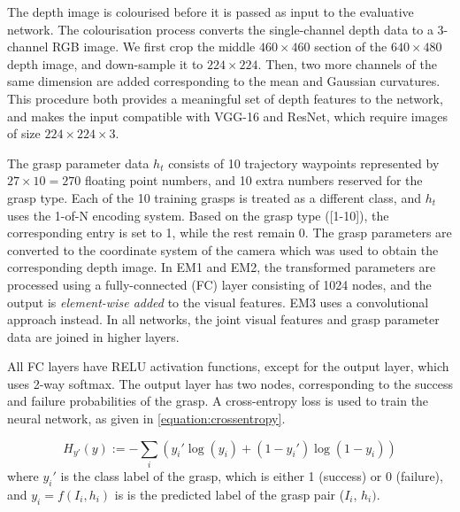 
The depth image is colourised before it is passed as input to the evaluative network. The colourisation process converts the single-channel depth data to a 3-channel RGB image. We first crop the middle $460 \times 460$ section of the $640 \times 480$ depth image, and down-sample it to $224 \times 224$. Then, two more channels of the same dimension are added corresponding to the mean and Gaussian curvatures. %
This procedure both provides a meaningful set of depth features to the network, and makes the input compatible with VGG-16 and ResNet, which require images of size $224 \times 224 \times 3$.

The grasp parameter data $h_t$ consists of 10 trajectory waypoints represented by $27 \times 10 = 270$ floating point numbers, and 10 extra numbers reserved for the grasp type. Each of the 10 training grasps is treated as a different class, and $h_t$ uses the 1-of-N encoding system. Based on the grasp type ([1-10]), the corresponding entry is set to 1, while the rest remain 0. The grasp parameters are converted to the coordinate system of the camera which was used to obtain the corresponding depth image. In EM1 and EM2, the transformed parameters are processed using a fully-connected (FC) layer consisting of 1024 nodes, and the output is \textit{element-wise added} to the visual features. EM3 uses a convolutional approach instead. In all networks, the joint visual features and grasp parameter data are joined in higher layers.

All FC layers have RELU activation functions, except for the output layer, which uses 2-way softmax. The output layer has two nodes, corresponding to the success and failure probabilities of the grasp. A cross-entropy loss is used to train the neural network, as given in \eq\ref{equation:crossentropy}.

\begin{equation}
H_{y'}(y) := - \sum_{i} ({y_i' \log(y_i) + (1-y_i') \log (1-y_i)})
\label{equation:crossentropy}
\end{equation}
where $y_i'$ is the class label of the grasp, which is either 1 (success) or 0 (failure), and $y_i = f(I_i, h_i)$ is is the predicted label of the grasp pair ($I_i$, $h_i)$.

